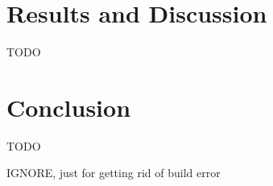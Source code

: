 \documentclass[11pt,a4paper]{article}
\begin{document}
\section{Results and Discussion}

TODO

\section{Conclusion}

TODO

IGNORE, just for getting rid of build error\cite{Aho:72}


%



\end{document}
